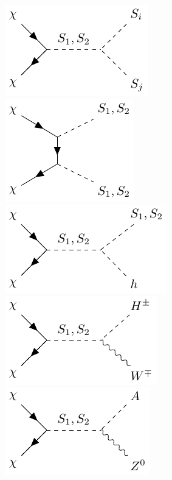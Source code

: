 \begin{figure}
    \centering
    \hspace{2em} 
    \includegraphics{texinputs/05_relic/figures/relic_scalar/XXSS.pdf} \hspace{3em} \vspace{2em} 
    \includegraphics{texinputs/05_relic/figures/relic_scalar/XXSSt.pdf} \hspace{3em} 
    \includegraphics{texinputs/05_relic/figures/relic_scalar/XXSh.pdf}  \hspace{0.5em} \\ 
    \includegraphics{texinputs/05_relic/figures/relic_scalar/XXWH.pdf} \hspace{2em} 
    \includegraphics{texinputs/05_relic/figures/relic_scalar/XXZA.pdf} \hspace{2em} 

\end{figure}
